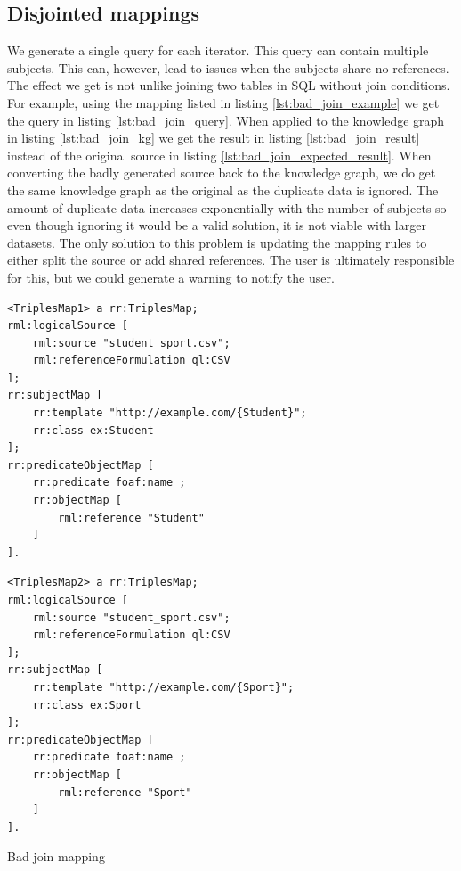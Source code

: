\subsection{Disjointed mappings}
\label{subsection:disjointed_mappings}

We generate a single query for each iterator. This query can contain multiple subjects. This can, however, lead to issues when the subjects share no references. The effect we get is not unlike joining two tables in SQL without join conditions. For example, using the mapping listed in listing \ref{lst:bad_join_example} we get the query in listing \ref{lst:bad_join_query}. When applied to the knowledge graph in listing \ref{lst:bad_join_kg} we get the result in listing \ref{lst:bad_join_result} instead of the original source in listing \ref{lst:bad_join_expected_result}. When converting the badly generated source back to the knowledge graph, we do get the same knowledge graph as the original as the duplicate data is ignored. The amount of duplicate data increases exponentially with the number of subjects so even though ignoring it would be a valid solution, it is not viable with larger datasets. The only solution to this problem is updating the mapping rules to either split the source or add shared references. The user is ultimately responsible for this, but we could generate a warning to notify the user. 

\begin{listing}
    \noindent\begin{minipage}[b]{.45\textwidth}
        \begin{lstlisting}[basicstyle=\small]
<TriplesMap1> a rr:TriplesMap;
rml:logicalSource [ 
    rml:source "student_sport.csv";
    rml:referenceFormulation ql:CSV
];
rr:subjectMap [ 
    rr:template "http://example.com/{Student}";
    rr:class ex:Student
];
rr:predicateObjectMap [ 
    rr:predicate foaf:name ; 
    rr:objectMap [ 
        rml:reference "Student"
    ]
].
        \end{lstlisting}      
    \end{minipage}
    \hfill
    \begin{minipage}[b]{.45\textwidth}
        \begin{lstlisting}[basicstyle=\small]
<TriplesMap2> a rr:TriplesMap;
rml:logicalSource [ 
    rml:source "student_sport.csv";
    rml:referenceFormulation ql:CSV
];
rr:subjectMap [ 
    rr:template "http://example.com/{Sport}";
    rr:class ex:Sport
];
rr:predicateObjectMap [ 
    rr:predicate foaf:name ; 
    rr:objectMap [ 
        rml:reference "Sport"
    ]
].
        \end{lstlisting}
    \end{minipage}
    \addtocounter{listing}{5}
    \caption{Bad join mapping}
    \label{lst:bad_join_example}
\end{listing}

